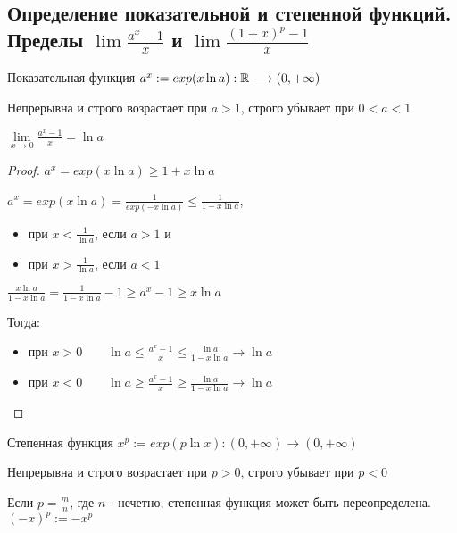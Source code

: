 \subsection{Определение показательной и степенной функций. Пределы $\lim{\frac{a^x - 1}{x}}$ и $\lim{\frac{(1+x)^p - 1}{x}}$ \href{https://youtu.be/an3AiCY2hPE?t=5109}{\Walley}}
\begin{conj}
    Показательная функция \qquad $a^x := exp(x \ln{a}): \mathbb{R} \longrightarrow (0, +\infty)$
    
    Непрерывна и строго возрастает при $a > 1$, строго убывает при $0 < a < 1$
\end{conj}

\begin{theorem-non}
    $\lim\limits_{x \rightarrow 0}{\frac{a^x - 1}{x}} = \ln{a}$

    \begin{proof}
        $a^x = exp(x \ln{a}) \geqslant 1 + x \ln{a}$

        $a^x = exp(x \ln{a}) = \frac{1}{exp(-x\ln{a})} \leqslant \frac{1}{1 - x \ln{a}}$,
        \begin{itemize}
            \item[] при $x < \frac{1}{\ln{a}}$, если $a > 1$ и 
            \item[] при $x > \frac{1}{\ln{a}}$, если $a < 1$ 
        \end{itemize}

        $\frac{x\ln{a}}{1 - x \ln{a}} = \frac{1}{1 - x \ln{a}} - 1 \geqslant a^x - 1 \geqslant x\ln{a}$

        Тогда:
        \begin{itemize}
            \item[] при $x > 0 \qquad \ln{a} \leqslant \frac{a^x - 1}{x} \leqslant \frac{\ln{a}}{1 - x \ln{a}} \longrightarrow \ln{a}$
            \item[] при $x < 0 \qquad \ln{a} \geqslant \frac{a^x - 1}{x} \geqslant \frac{\ln{a}}{1 - x \ln{a}} \longrightarrow \ln{a}$
        \end{itemize}
    \end{proof}
\end{theorem-non}

\begin{conj}
        Степенная функция $x^p := exp(p \ln{x}) : (0, +\infty) \longrightarrow (0, +\infty)$

        Непрерывна и строго возрастает при $p > 0$, строго убывает при $p < 0$

        Если $p = \frac{m}{n}$, где $n$ - нечетно, степенная функция может быть переопределена. $(-x)^p := -x^p$
\end{conj}

